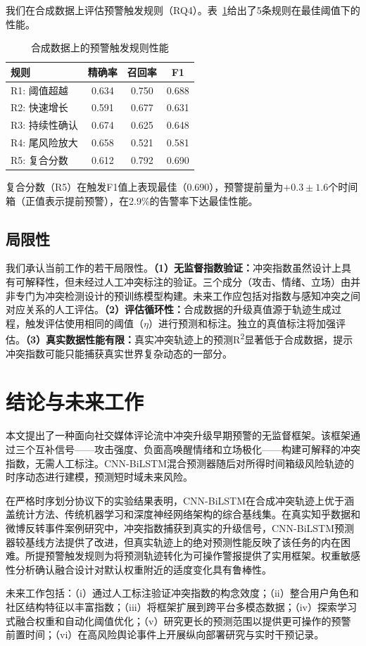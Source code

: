 \documentclass[conference]{IEEEtran}
\begin{document}
我们在合成数据上评估预警触发规则（RQ4）。表~\ref{tab:warning}给出了5条规则在最佳阈值下的性能。

\begin{table}[h]
\caption{合成数据上的预警触发规则性能}
\label{tab:warning}
\centering
\begin{tabular}{lccc}
\hline
\textbf{规则} & \textbf{精确率} & \textbf{召回率} & \textbf{F1} \\
\hline
R1: 阈值超越 & 0.634 & 0.750 & 0.688 \\
R2: 快速增长 & 0.591 & 0.677 & 0.631 \\
R3: 持续性确认 & 0.674 & 0.625 & 0.648 \\
R4: 尾风险放大 & 0.658 & 0.521 & 0.581 \\
R5: 复合分数 & 0.612 & 0.792 & 0.690 \\
\hline
\end{tabular}
\end{table}

\noindent 复合分数（R5）在触发F1值上表现最佳（0.690），预警提前量为$+0.3\pm1.6$个时间箱（正值表示提前预警），在2.9\%的告警率下达最佳性能。

\subsection{局限性}

我们承认当前工作的若干局限性。\textbf{（1）无监督指数验证：}冲突指数虽然设计上具有可解释性，但未经过人工冲突标注的验证。三个成分（攻击、情绪、立场）由并非专门为冲突检测设计的预训练模型构建。未来工作应包括对指数与感知冲突之间对应关系的人工评估。\textbf{（2）评估循环性：}合成数据的升级真值源于轨迹生成过程，触发评估使用相同的阈值（$\eta$）进行预测和标注。独立的真值标注将加强评估。\textbf{（3）真实数据性能有限：}真实冲突轨迹上的预测R\textsuperscript{2}显著低于合成数据，提示冲突指数可能只能捕获真实世界复杂动态的一部分。

\section{结论与未来工作}

本文提出了一种面向社交媒体评论流中冲突升级早期预警的无监督框架。该框架通过三个互补信号——攻击强度、负面高唤醒情绪和立场极化——构建可解释的冲突指数，无需人工标注。CNN-BiLSTM混合预测器随后对所得时间箱级风险轨迹的时序动态进行建模，预测短时域未来风险。

在严格时序划分协议下的实验结果表明，CNN-BiLSTM在合成冲突轨迹上优于涵盖统计方法、传统机器学习和深度神经网络架构的综合基线集。在真实知乎数据和微博反转事件案例研究中，冲突指数捕获到真实的升级信号，CNN-BiLSTM预测器较基线方法提供了改进，但真实轨迹上的绝对预测性能反映了该任务的内在困难。所提预警触发规则为将预测轨迹转化为可操作警报提供了实用框架。权重敏感性分析确认融合设计对默认权重附近的适度变化具有鲁棒性。

未来工作包括：（i）通过人工标注验证冲突指数的构念效度；（ii）整合用户角色和社区结构特征以丰富指数；（iii）将框架扩展到跨平台多模态数据；（iv）探索学习式融合权重和自动化阈值优化；（v）研究更长的预测范围以提供更可操作的预警前置时间；（vi）在高风险舆论事件上开展纵向部署研究与实时干预记录。



\end{document}
